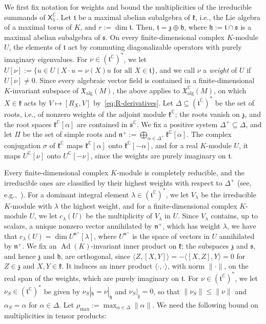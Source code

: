 \documentclass{article}
\newcommand{\C}{\mathbb{C}}
\newcommand{\frakk}{\mathfrak{k}}
\newcommand{\fraks}{\mathfrak{s}}
\newcommand{\frakz}{\mathfrak{z}}
\newcommand{\frakt}{\mathfrak{t}}
\newcommand{\frakh}{\mathfrak{h}}
\newcommand{\frakn}{\mathfrak{n}}
\newcommand{\xalg}{\mathfrak X_{\mathrm{alg}}}
\newcommand{\sX}{\mathsf{X}}
\theoremstyle{definition}
\theoremstyle{plain}
\begin{document}
We first fix notation for weights and bound the multiplicities of the irreducible summands of $\sX_1^\C$.
Let $\frakt$ be a maximal abelian subalgebra of $\frakk$, i.e., the Lie algebra of a maximal torus of $K$, and $r:=\dim\frakt$.
Then, $\frakt=\frakz\oplus\frakh$, where $\frakh:=\frakt\cap\fraks$ is a maximal abelian subalgebra of $\fraks$.
On every finite-dimensional complex $K$-module $U$, the elements of $\frakt$ act by commuting diagonalizable operators with purely imaginary eigenvalues.
For $\nu\in(\frakt^\C)^*$, we let $U[\nu]:=\{u\in U\mid X\cdot u=\nu(X)u\mbox{ for all }X\in\frakt\}$, and we call $\nu$ a {\it weight} of $U$ if $U[\nu]\neq0$.
Since every algebraic vector field is contained in a finite-dimensional $K$-invariant subspace of $\xalg(M)$,
  the above applies to $\xalg^\C(M)$, on which $X\in\frakk$ acts by $V\mapsto[R_X,V]$ by~\eqref{eq:R-derivatives}.
Let $\Delta\subseteq(\frakt^\C)^*$ be the set of roots, i.e., of nonzero weights of the adjoint module $\frakk^\C$; the roots vanish on $\frakz$, and the root spaces $\frakk^\C[\alpha]$ are contained in $\fraks^\C$.
We fix a positive system $\Delta^+\subseteq\Delta$, and let $\Pi$ be the set of simple roots and $\frakn^+:=\bigoplus_{\alpha\in\Delta^+}\frakk^\C[\alpha]$.
The complex conjugation $\sigma$ of $\frakk^\C$ maps $\frakk^\C[\alpha]$ onto $\frakk^\C[-\alpha]$, and for a real $K$-module $U$, it maps $U^\C[\nu]$ onto $U^\C[-\nu]$, since the weights are purely imaginary on $\frakt$.

Every finite-dimensional complex $K$-module is completely reducible, and the irreducible ones are classified by their highest weights with respect to $\Delta^+$ (see, e.g.,~\cite[Chapter~VI]{BtD}).
For a dominant integral element $\lambda\in (\frakt^\C)^*$, we let $V_\lambda$ be the irreducible $K$-module with $\lambda$ the highest weight, and for a finite-dimensional complex $K$-module $U$, we let $c_\lambda(U)$ be the multiplicity of $V_\lambda$ in $U$.
Since $V_\lambda$ contains, up to scalars, a unique nonzero vector annihilated by $\frakn^+$, which has weight $\lambda$, we have that $c_\lambda(U)=\dim U^{\frakn^+}[\lambda]$, where $U^{\frakn^+}$ is the space of vectors in $U$ annihilated by $\frakn^+$.
We fix an $\operatorname{Ad}(K)$-invariant inner product on $\frakk$; the subspaces $\frakz$ and $\fraks$, and hence $\frakz$ and $\frakh$, are orthogonal, since $\langle Z,[X,Y]\rangle=-\langle[X,Z],Y\rangle=0$ for $Z\in\frakz$ and $X,Y\in\frakk$.
It induces an inner product $\langle\cdot,\cdot\rangle$, with norm $\|\cdot\|$, on the real span of the weights, which are purely imaginary on $\frakt$.
For $\nu\in(\frakt^\C)^*$, we let $\nu_S\in(\frakt^\C)^*$ be given by $\nu_S|_{\frakh}=\nu|_{\frakh}$ and $\nu_S|_{\frakz}=0$, so that $\|\nu_S\|\leq\|\nu\|$ and $\alpha_S=\alpha$ for $\alpha\in\Delta$.
Let $\rho_{\max}:=\max_{\alpha\in\Delta}\|\alpha\|$.
We need the following bound on multiplicities in tensor products:
\end{document}
